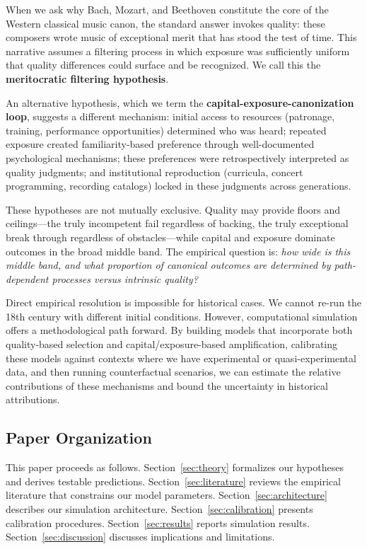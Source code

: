 \documentclass[11pt,a4paper]{article}
\begin{document}
When we ask why Bach, Mozart, and Beethoven constitute the core of the Western classical music canon, the standard answer invokes quality: these composers wrote music of exceptional merit that has stood the test of time. This narrative assumes a filtering process in which exposure was sufficiently uniform that quality differences could surface and be recognized. We call this the \textbf{meritocratic filtering hypothesis}.

An alternative hypothesis, which we term the \textbf{capital-exposure-canonization loop}, suggests a different mechanism: initial access to resources (patronage, training, performance opportunities) determined who was heard; repeated exposure created familiarity-based preference through well-documented psychological mechanisms; these preferences were retrospectively interpreted as quality judgments; and institutional reproduction (curricula, concert programming, recording catalogs) locked in these judgments across generations.

These hypotheses are not mutually exclusive. Quality may provide floors and ceilings---the truly incompetent fail regardless of backing, the truly exceptional break through regardless of obstacles---while capital and exposure dominate outcomes in the broad middle band. The empirical question is: \textit{how wide is this middle band, and what proportion of canonical outcomes are determined by path-dependent processes versus intrinsic quality?}

Direct empirical resolution is impossible for historical cases. We cannot re-run the 18th century with different initial conditions. However, computational simulation offers a methodological path forward. By building models that incorporate both quality-based selection and capital/exposure-based amplification, calibrating these models against contexts where we have experimental or quasi-experimental data, and then running counterfactual scenarios, we can estimate the relative contributions of these mechanisms and bound the uncertainty in historical attributions.

\subsection{Paper Organization}

This paper proceeds as follows. Section~\ref{sec:theory} formalizes our hypotheses and derives testable predictions. Section~\ref{sec:literature} reviews the empirical literature that constrains our model parameters. Section~\ref{sec:architecture} describes our simulation architecture. Section~\ref{sec:calibration} presents calibration procedures. Section~\ref{sec:results} reports simulation results. Section~\ref{sec:discussion} discusses implications and limitations.
\end{document}
